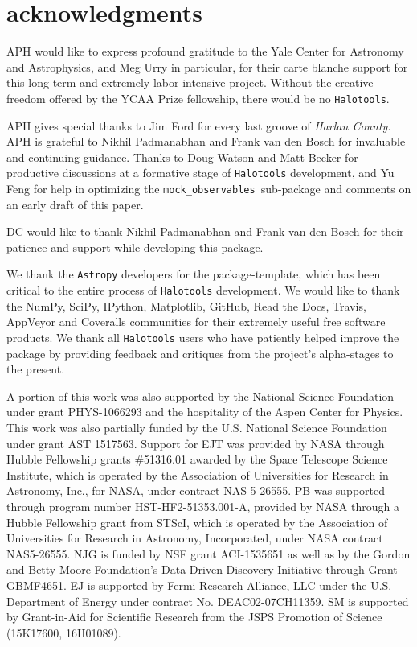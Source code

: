 \documentclass[twocolumn, tighten]{aastex6}
\newcommand{\mockobs}{{\tt mock\_observables }}
\begin{document}

\section{acknowledgments}

APH would like to express profound gratitude to the Yale Center for Astronomy and Astrophysics, and Meg Urry in particular, for their carte blanche support for this long-term and extremely labor-intensive project. Without the creative freedom offered by the YCAA Prize fellowship, there would be no {\tt Halotools}.

APH gives special thanks to Jim Ford for every last groove of {\em Harlan County}. APH is grateful to Nikhil Padmanabhan and Frank van den Bosch for invaluable and continuing guidance. Thanks to Doug Watson and Matt Becker for productive discussions at a formative stage of {\tt Halotools} development, and Yu Feng for help in optimizing the \mockobs sub-package and comments on an early draft of this paper.

DC would like to thank Nikhil Padmanabhan and Frank van den Bosch for their patience and support while developing this package.

We thank the {\tt Astropy} developers for the package-template, which has been critical to the entire process of {\tt Halotools} development.
We would like to thank the NumPy, SciPy, IPython, Matplotlib, GitHub, Read the Docs, Travis, AppVeyor and Coveralls communities for their extremely useful free software products. We thank all {\tt Halotools} users who have patiently helped improve the package by providing feedback and critiques from the project's alpha-stages to the present. 

A portion of this work was also supported by the National Science Foundation under grant PHYS-1066293 and the hospitality of the Aspen Center for Physics. This work was also partially funded by the U.S. National Science Foundation under grant AST 1517563. Support for EJT was provided by NASA through Hubble Fellowship grants \#51316.01 awarded by the Space Telescope Science Institute, which is operated by the Association of Universities for Research in Astronomy, Inc., for NASA, under contract NAS 5-26555.  PB was supported through program number HST-HF2-51353.001-A, provided by NASA through a Hubble Fellowship grant from STScI, which is operated by the Association of Universities for Research in Astronomy, Incorporated, under NASA contract NAS5-26555. NJG is funded by NSF grant ACI-1535651 as well as by the Gordon and Betty Moore Foundation's Data-Driven Discovery Initiative through Grant GBMF4651. EJ is supported by Fermi Research Alliance, LLC under the U.S. Department of Energy under contract No. DEAC02-07CH11359. SM is supported by Grant-in-Aid for Scientific Research from the JSPS Promotion of Science (15K17600, 16H01089).












\end{document}
